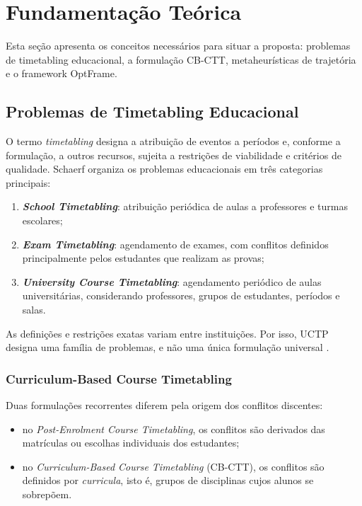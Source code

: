 \section{Fundamentação Teórica}
\label{sec:fundamentacao}

Esta seção apresenta os conceitos necessários para situar a proposta: problemas de timetabling educacional, a formulação CB-CTT, metaheurísticas de trajetória e o framework OptFrame.

\subsection{Problemas de Timetabling Educacional}
\label{subsec:timetabling_teoria}

O termo \textit{timetabling} designa a atribuição de eventos a períodos e, conforme a formulação, a outros recursos, sujeita a restrições de viabilidade e critérios de qualidade. Schaerf \cite{schaerf1999survey} organiza os problemas educacionais em três categorias principais:
\begin{enumerate}
    \item \textbf{\textit{School Timetabling}}: atribuição periódica de aulas a professores e turmas escolares;
    \item \textbf{\textit{Exam Timetabling}}: agendamento de exames, com conflitos definidos principalmente pelos estudantes que realizam as provas;
    \item \textbf{\textit{University Course Timetabling}}: agendamento periódico de aulas universitárias, considerando professores, grupos de estudantes, períodos e salas.
\end{enumerate}

As definições e restrições exatas variam entre instituições. Por isso, UCTP designa uma família de problemas, e não uma única formulação universal \cite{lewis2008survey,babaei2015survey}.

\subsubsection{Curriculum-Based Course Timetabling}

Duas formulações recorrentes diferem pela origem dos conflitos discentes:
\begin{itemize}
    \item no \textit{Post-Enrolment Course Timetabling}, os conflitos são derivados das matrículas ou escolhas individuais dos estudantes;
    \item no \textit{Curriculum-Based Course Timetabling} (CB-CTT), os conflitos são definidos por \textit{curricula}, isto é, grupos de disciplinas cujos alunos se sobrepõem.
\end{itemize}


